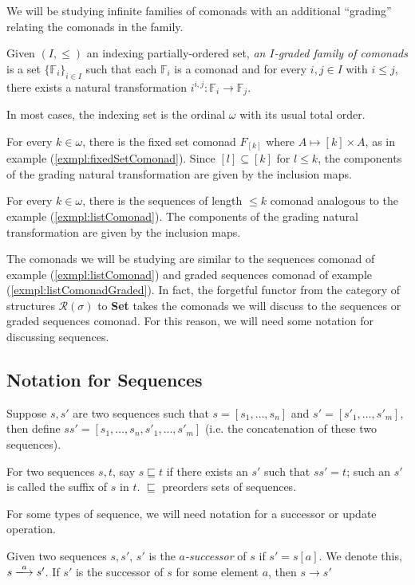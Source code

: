 We will be studying infinite families of comonads with an additional ``grading'' relating the comonads in the family.
\begin{defn}
Given $(I,\leq)$ an indexing partially-ordered set, \textit{an $I$-graded family of comonads} is a set $\{\mathbb{F}_{i}\}_{i \in I}$ such that each $\mathbb{F}_{i}$ is a comonad and for every $i, j \in I$ with $i \leq j$, there exists a natural transformation $i^{i,j}:\mathbb{F}_{i} \longrightarrow \mathbb{F}_{j}$.  
\end{defn}
In most cases, the indexing set is the ordinal $\omega$ with its usual total order.  
\begin{exmpl}
For every $k \in \omega$, there is the fixed set comonad $F_{[k]}$ where $A \mapsto [k] \times A$, as in example (\ref{exmpl:fixedSetComonad}). Since $[l] \subseteq [k]$ for $l \leq k$, the components of the grading natural transformation are given by the inclusion maps. 
\end{exmpl}
\begin{exmpl}
For every $k \in \omega$, there is the sequences of length $\leq k$ comonad analogous to the example (\ref{exmpl:listComonad}). The components of the grading natural transformation are given by the inclusion maps. 
\label{exmpl:listComonadGraded}
\end{exmpl}
\begin{rmrk}
The comonads we will be studying are similar to the sequences comonad of example (\ref{exmpl:listComonad}) and graded sequences comonad of example (\ref{exmpl:listComonadGraded}). In fact, the forgetful functor from the category of structures $\mathcal{R}(\sigma)$ to \textbf{Set} takes the comonads we will discuss to the sequences or graded sequences comonad. For this reason, we will need some notation for discussing sequences. 
\end{rmrk}
\subsection*{Notation for Sequences}
\begin{defn}
Suppose $s,s'$ are two sequences such that $s = [s_{1},\dots,s_{n}]$ and $s' = [s'_{1},\dots,s'_{m}]$, then define $ss' = [s_{1},
\dots,s_{n},s'_{1},\dots,s'_{m}]$ (i.e. the concatenation of these two sequences).
\label{defn:concat}
\end{defn}
\begin{defn}
For two sequences $s,t$, say $s \sqsubseteq t$ if there exists an $s'$ such that $ss' = t$; such an $s'$ is called the suffix of $s$ in $t$. $\sqsubseteq$ preorders sets of sequences.  
\end{defn}
For some types of sequence, we will need notation for a successor or update operation. 
\begin{defn}
Given two sequences $s,s'$, $s'$ is the \textit{$a$-successor} of $s$ if $s' = s[a]$. We denote this, $s \xlongrightarrow{a} s'$. If $s'$ is the successor of $s$ for some element $a$, then $s \longrightarrow s'$
\end{defn}
